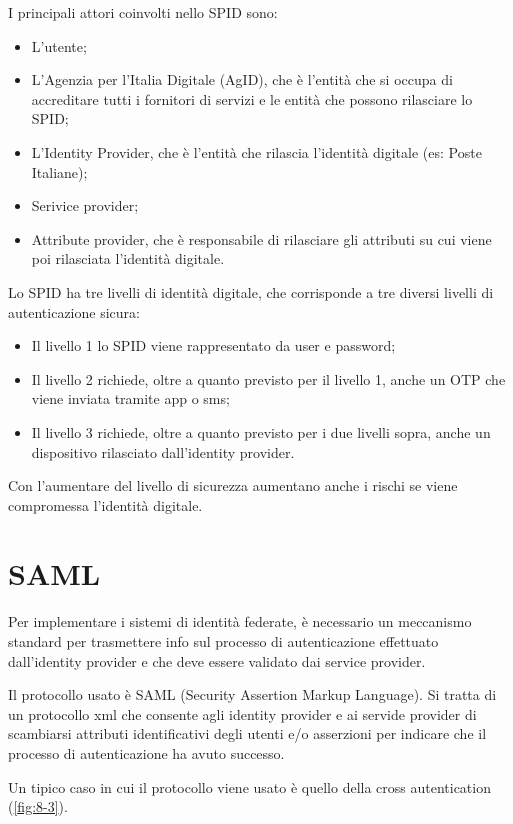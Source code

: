 \noindent I principali attori coinvolti nello SPID sono:
\begin{itemize}
    \item L'utente;
    \item L'Agenzia per l'Italia Digitale (AgID), che è l'entità che si occupa di accreditare tutti i fornitori di servizi e le entità che possono rilasciare lo SPID;
    \item L'Identity Provider, che è l'entità che rilascia l'identità digitale (es: Poste Italiane);
    \item Serivice provider;
    \item Attribute provider, che è responsabile di rilasciare gli attributi su cui viene poi rilasciata l'identità digitale. 
\end{itemize}

\noindent Lo SPID ha tre livelli di identità digitale, che corrisponde a tre diversi livelli di autenticazione sicura:
\begin{itemize}
    \item Il livello 1 lo SPID viene rappresentato da user e password;
    \item Il livello 2 richiede, oltre a quanto previsto per il livello 1,  anche un OTP che viene inviata tramite app o sms;
    \item Il livello 3 richiede, oltre a quanto previsto per i due livelli sopra, anche un dispositivo rilasciato dall'identity provider.
\end{itemize}

\noindent Con l'aumentare del livello di sicurezza aumentano anche i rischi se viene compromessa l'identità digitale.

\section{SAML}
Per implementare i sistemi di identità federate, è necessario un meccanismo standard per trasmettere info sul processo di autenticazione effettuato dall'identity provider e che deve essere validato dai service provider.

Il protocollo usato è SAML (Security Assertion Markup Language). Si tratta di un protocollo xml che consente agli identity provider e ai servide provider di scambiarsi attributi identificativi degli utenti e/o asserzioni per indicare che il processo di autenticazione ha avuto successo. 

Un tipico caso in cui il protocollo viene usato è quello della cross autentication (\ref{fig:8-3}).

